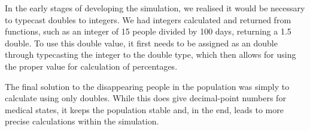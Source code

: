 In the early stages of developing the simulation, we realised it would be necessary to typecast doubles to integers. We had integers calculated and returned from functions, such as an integer of 15 people divided by 100 days, returning a 1.5 double. To use this double value, it first needs to be assigned as an double through typecasting the integer to the double type, which then allows for using the proper value for calculation of percentages.  

The final solution to the disappearing people in the population was simply to calculate using only doubles. While this does give decimal-point numbers for medical states, it keeps the population stable and, in the end, leads to more precise calculations within the simulation.